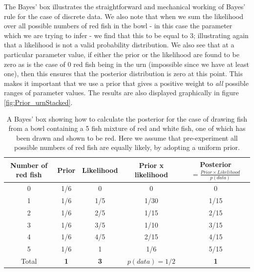 \documentclass[11pt,fullpage]{book}
\begin{document}
The Bayes' box illustrates the straightforward and mechanical working of Bayes' rule for the case of discrete data. We also note that when we sum the likelihood over all possible numbers of red fish in the bowl - in this case the parameter which we are trying to infer - we find that this to be equal to 3; illustrating again that a likelihood is not a valid probability distribution. We also see that at a particular parameter value, if either the prior or the likelihood are found to be zero as is the case of 0 red fish being in the urn (impossible since we have at least one), then this ensures that the posterior distribution is zero at this point. This makes it important that we use a prior that gives a positive weight to \textit{all} possible ranges of parameter values. The results are also displayed graphically in figure \ref{fig:Prior_urnStacked}.

\begin{table}[htbp]
  \centering
  \caption{A Bayes' box showing how to calculate the posterior for the case of drawing fish from a bowl containing a 5 fish mixture of red and white fish, one of which has been drawn and shown to be red. Here we assume that pre-experiment all possible numbers of red fish are equally likely, by adopting a uniform prior.}\label{tab:Prior_bayesBoxDiscreteUrns}
    \begin{tabular}{ccccc}
    \toprule
    \textbf{Number of red fish} & \textbf{Prior} & \textbf{Likelihood} & \textbf{Prior x likelihood} & \textbf{Posterior$=\frac{Prior\times Likelihood}{p(data)}$} \\
    \midrule
    0     &  1/6  & 0     & 0       & 0       \\
    1     &  1/6  &  1/5  &   1/30 &   1/15 \\
    2     &  1/6  &  2/5  &   1/15 &   2/15 \\
    3     &  1/6  &  3/5  &   1/10 &   3/15  \\
    4     &  1/6  &  4/5  &   2/15 &   4/15 \\
    5     &  1/6  & 1     &   1/6  &   5/15  \\
    \bottomrule
    Total & \textbf{1    } & \textbf{3    } & \textbf{$p(data)=1/2$ } & \textbf{1      } \\
    \bottomrule
    \end{tabular}%
  \label{tab:addlabel}%
\end{table}%
\end{document}
